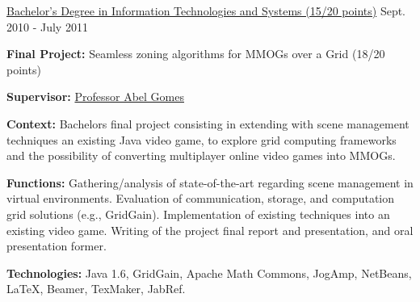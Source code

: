 \begin{cventries}
  \cventry
    {\href{https://www.ubi.pt/en/course/64}{Bachelor's Degree in Information Technologies and Systems (15/20 points)}} %
    {} %
    {} %
    {Sept. 2010 - July 2011} %
    {
      \begin{cvitems} %
        \item {\textbf{Final Project:} Seamless zoning algorithms for MMOGs over a Grid (18/20 points)}
		\item {\textbf{Supervisor:} \href{http://www.di.ubi.pt/~agomes/}{Professor Abel Gomes}}
		\item {\textbf{Context:} Bachelors final project consisting in extending with scene management techniques an existing Java video game, to explore grid computing frameworks and the possibility of converting multiplayer online video games into MMOGs.}
		\item {\textbf{Functions:} Gathering/analysis of state-of-the-art regarding scene management in virtual environments. Evaluation of communication, storage, and computation grid solutions (e.g., GridGain). Implementation of existing techniques into an existing video game. Writing of the project final report and presentation, and oral presentation former.}
		\item {\textbf{Technologies:} Java 1.6, GridGain, Apache Math Commons, JogAmp, NetBeans, LaTeX, Beamer, TexMaker, JabRef.}
      \end{cvitems}
    }
  

\end{cventries}
